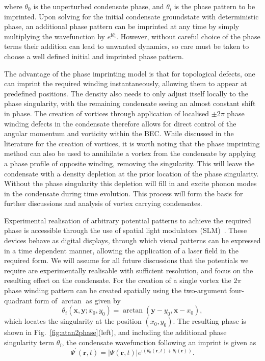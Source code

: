 where $\theta_0$ is the unperturbed condensate phase, and $\theta_i$ is the phase pattern to be imprinted. Upon solving for the initial condensate groundstate with deterministic phase, an additional phase pattern can be imprinted at any time by simply multiplying the wavefunction by $e^{\text{i}\theta_i}$. However, without careful choice of the phase terms their addition can lead to unwanted dynamics, so care must be taken to choose a well defined initial and imprinted phase pattern.

The advantage of the phase imprinting model is that for topological defects, one can imprint the required winding instantaneously, allowing them to appear at predefined positions. The density also needs to only adjust itself locally to the phase singularity, with the remaining condensate seeing an almost constant shift in phase. The creation of vortices through application of localised $\pm 2\pi$ phase winding defects in the condensate therefore allows for direct control of the angular momentum and vorticity within the BEC. While discussed in the literature for the creation of vortices, it is worth noting that the phase imprinting method can also be used to annihilate a vortex from the condensate by applying a phase profile of opposite winding, removing the singularity. This will leave the condensate with a density depletion at the prior location of the phase singularity. Without the phase singularity this depletion will fill in and excite phonon modes in the condensate during time evolution. This process will form the basis for further discussions and analysis of vortex carrying condensates.

Experimental realisation of arbitrary potential patterns to achieve the required phase is accessible through the use of spatial light modulators (SLM)~\cite{VTX:Moulder_pra_2012}. These devices behave as digital displays, through which visual patterns can be expressed in a time dependent manner, allowing the application of a laser field in the required form. We will assume for all future discussions that the potentials we require are experimentally realisable with sufficient resolution, and focus on the resulting effect on the condensate. For the creation of a single vortex the $2\pi$ phase winding pattern can be created spatially using the two-argument four-quadrant form of $\arctan$ as given by
\begin{equation}
    \theta_i(\mathbf{x},\mathbf{y};x_0,y_0) = \arctan(\mathbf{y}-y_0,\mathbf{x}-x_0),
\end{equation}
which locates the singularity at the position $\left(x_0,y_0\right)$. The resulting phase is shown in Fig.~\ref{fig:atan2phase}(left), and including the additional phase singularity term $\theta_i$, the condensate wavefunction following an imprint is given as
\begin{equation}
    \Psi^{'}(\mathbf{r},t) = |\Psi(\mathbf{r},t)|e^{\text{i}(\theta_0(\mathbf{r},t) + \theta_i(\mathbf{r}))}.
\end{equation}

